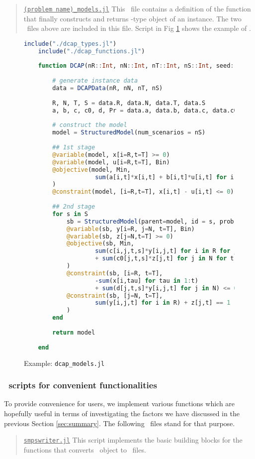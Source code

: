 \begin{quote}
\noindent\underline{\texttt{(problem name)\_models.jl}} This \julia\ file contains a definition of the function that finally constructs and returns \jumpmodel-type object of an instance. The two \julia\ files above are included in this file. Script in Fig \ref{fig:dcap_models} shows the example of \dcap.
\end{quote}
\begin{figure}[H]
	\centering
	\begin{lstlisting}[frame=single,language=julia]
	include("./dcap_types.jl")
	include("./dcap_functions.jl")
	
	function DCAP(nR::Int, nN::Int, nT::Int, nS::Int, seed::Int)::JuMP.Model
	
		# generate instance data
		data = DCAPData(nR, nN, nT, nS)
		
		R, N, T, S = data.R, data.N, data.T, data.S
		a, b, c, c0, d, Pr = data.a, data.b, data.c, data.c0, data.d, data.Pr
		
		# construct the model
		model = StructuredModel(num_scenarios = nS)
		
		## 1st stage
		@variable(model, x[i=R,t=T] >= 0)
		@variable(model, u[i=R,t=T], Bin)
		@objective(model, Min, 
					sum(a[i,t]*x[i,t] + b[i,t]*u[i,t] for i in R for t in T)
		)
		@constraint(model, [i=R,t=T], x[i,t] - u[i,t] <= 0)
		
		## 2nd stage
		for s in S
			sb = StructuredModel(parent=model, id = s, prob = Pr[s])
			@variable(sb, y[i=R, j=N, t=T], Bin)
			@variable(sb, z[j=N,t=T] >= 0)
			@objective(sb, Min, 
					sum(c[i,j,t,s]*y[i,j,t] for i in R for j in N for t in T) 
					+ sum(c0[j,t,s]*z[j,t] for j in N for t in T)
			)
			@constraint(sb, [i=R, t=T], 
					-sum(x[i,tau] for tau in 1:t) 
					+ sum(d[j,t,s]*y[i,j,t] for j in N) <= 0)
			@constraint(sb, [j=N, t=T], 
					sum(y[i,j,t] for i in R) + z[j,t] == 1
			)
		end
	
		return model
		
	end
	\end{lstlisting}
	\caption{Example: \texttt{dcap\_models.jl}}\label{fig:dcap_models}
\end{figure}

\subsubsection{\julia\ scripts for convenient functionalities}
To provide convenience for users, we implement various functions which are hopefully useful in terms of investigating the factors we have discussed in the previous Section \ref{sec:summary}. The following \julia\ files stand for that purpose.
\begin{quotation}
	\noindent\underline{\texttt{smpswriter.jl}} This script implements the basic building blocks for the functions that converts \jumpmodel\ object to \smps\ files. 
\end{quotation}

